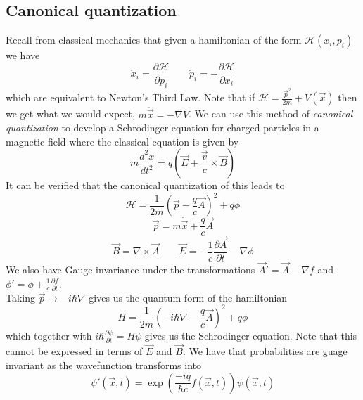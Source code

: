 \documentclass{article}
\begin{document}
\subsection{Canonical quantization}
Recall from classical mechanics that given a hamiltonian of the form $\mathcal{H}(x_i, p_i)$ we have
$$\dot x_i = \frac{\partial \mathcal H}{\partial p_i} \qquad \dot p_i = - \frac{\partial \mathcal H}{\partial x_i}$$
which are equivalent to Newton's Third Law. Note that if $\mathcal H=\frac{\vec p^2}{2m}+V(\vec x)$ then we get what we would expect, $m\ddot{\vec{x}} = -\nabla V$. We can use this method of \emph{canonical quantization} to develop a Schrodinger equation for charged particles in a magnetic field where the classical equation is given by
$$m\frac{d^2 x}{dt^2} = q\left(\vec E + \frac{\vec v}{c} \times \vec B\right)$$
It can be verified that the canonical quantization of this leads to
$$\mathcal H =\frac{1}{2m}\left(\vec p -\frac{q}{c}\vec A\right)^2+q\phi$$
$$\vec p = m\dot{\vec x}+\frac{q}{c} \vec A$$
$$\vec B=\nabla \times \vec A \qquad \vec E = -\frac{1}{c} \frac{\partial \vec A}{\partial t} - \nabla \phi$$
We also have Gauge invariance under the transformations $\vec A'=\vec A-\nabla f $ and $ \phi' = \phi +\frac{1}{c}\frac{\partial f}{\partial t}$.\\
Taking $\vec p \rightarrow -i\hbar \nabla$ gives us the quantum form of the hamiltonian
$$H=\frac{1}{2m}\left(-i\hbar \nabla -\frac{q}{c} \vec A\right)^2+q\phi$$
which together with $i\hbar \frac{\partial \psi}{\partial t} =H\psi$ gives us the Schrodinger equation. Note that this cannot be expressed in terms of $\vec E$ and $\vec B$. We have that probabilities are guage invariant as the wavefunction transforms into
$$\psi'(\vec x,t) = \exp \left(\frac{-iq}{\hbar c} f(\vec x, t)\right) \psi(\vec x, t)$$
\end{document}
